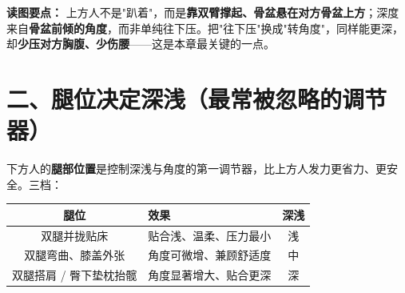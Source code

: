 \documentclass[12pt,UTF8,openany]{ctexbook}
\begin{document}
\noindent\textbf{读图要点：} 上方人不是"趴着"，而是\textbf{靠双臂撑起、骨盆悬在对方骨盆上方}；深度来自\textbf{骨盆前倾的角度}，而非单纯往下压。把"往下压"换成"转角度"，同样能更深，却\textbf{少压对方胸腹、少伤腰}——这是本章最关键的一点。

\section{二、腿位决定深浅（最常被忽略的调节器）}

下方人的\textbf{腿部位置}是控制深浅与角度的第一调节器，比上方人发力更省力、更安全。三档：

\begin{tabularx}{\textwidth}{C X C}
\toprule
腿位 & 效果 & 深浅 \\
\midrule
双腿并拢贴床 & 贴合浅、温柔、压力最小 & 浅 \\
双腿弯曲、膝盖外张 & 角度可微增、兼顾舒适度 & 中 \\
双腿搭肩 / 臀下垫枕抬髋 & 角度显著增大、贴合更深 & 深 \\
\bottomrule
\end{tabularx}
\end{document}
